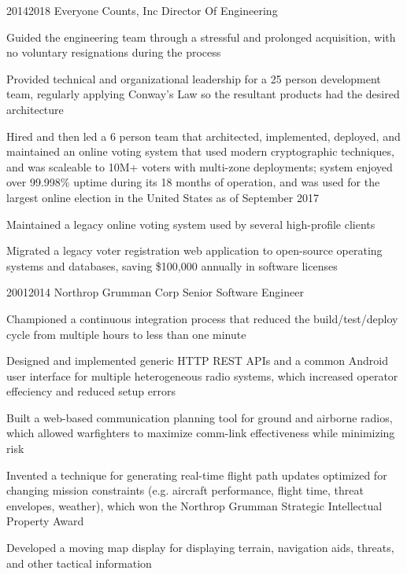 \documentclass{article}
\begin{document}
\job
  {2014}{2018}
  {Everyone Counts, Inc}
  {Director Of Engineering}
  {\begin{achievements}
    \item Guided the engineering team through a stressful and prolonged acquisition, with no voluntary resignations during the process
    \item Provided technical and organizational leadership for a 25 person development team, regularly applying Conway's Law so the resultant products had the desired architecture
    \item Hired and then led a 6 person team that architected, implemented, deployed, and maintained an online voting system that used modern cryptographic techniques, and was scaleable to 10M+ voters with multi-zone deployments; system enjoyed over 99.998\% uptime during its 18 months of operation, and was used for the largest online election in the United States as of September 2017
    \item Maintained a legacy online voting system used by several high-profile clients
    \item Migrated a legacy voter registration web application to open-source operating systems and databases, saving \$100,000 annually in software licenses
  \end{achievements}}

\job
  {2001}{2014}
  {Northrop Grumman Corp}
  {Senior Software Engineer}
  {\begin{achievements}
    \item Championed a continuous integration process that reduced the build/test/deploy cycle from multiple hours to less than one minute
    \item Designed and implemented generic HTTP REST APIs and a common Android user interface for multiple heterogeneous radio systems, which increased operator effeciency and reduced setup errors
    \item Built a web-based communication planning tool for ground and airborne radios, which allowed warfighters to maximize comm-link effectiveness while minimizing risk
    \item Invented a technique for generating real-time flight path updates optimized for changing mission constraints (e.g. aircraft performance, flight time, threat envelopes, weather), which won the Northrop Grumman Strategic Intellectual Property Award
    \item Developed a moving map display for displaying terrain, navigation aids, threats, and other tactical information
  \end{achievements}}
\end{document}
